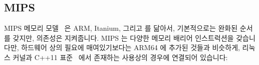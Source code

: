 \subsection{MIPS}

MIPS 메모리 모델~\cite[Table 6.6]{MIPSvII-A-2015} 은 ARM, Itanium, 그리고
\Power{} 를 닮아서, 기본적으로는 완화된 순서를 갖지만, 의존성은 지켜줍니다.
MIPS 는 다양한 메모리 배리어 인스트럭션을 갖습니다만, 하드웨어 상의 필요에
매여있기보다는 ARM64 에 추가된 것들과 비슷하게, 리눅스 커널과 C++11
표준~\cite{RichardSmith2015N4527} 에서 존재하는 사용상의 경우에 연결되어
있습니다:

